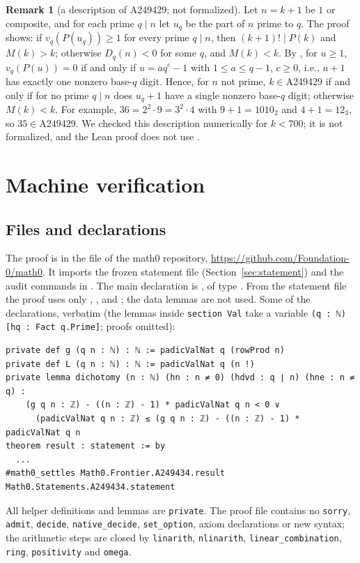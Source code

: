 \documentclass[11pt]{amsart}
\theoremstyle{plain}
\theoremstyle{definition}
\newtheorem{remark}[theorem]{Remark}
\begin{document}
\begin{remark}[a description of A249429; not formalized]\label{rem:A249429}
Let $n=k+1$ be $1$ or composite, and for each prime $q\mid n$ let $u_q$ be the part of $n$ prime to $q$. The proof shows: if $v_q(P(u_q))\ge1$ for every prime $q\mid n$, then $(k+1)!\mid P(k)$ and $M(k)>k$; otherwise $D_q(n)<0$ for some $q$, and $M(k)<k$.
By \cite[Theorem~6.7]{LM}, for $u\ge1$, $v_q(P(u))=0$ if and only if $u=aq^c-1$ with $1\le a\le q-1$, $c\ge0$, i.e., $u+1$ has exactly one nonzero base-$q$ digit. Hence, for $n$ not prime, $k\in{}$A249429 if and only if for no prime $q\mid n$ does $u_q+1$ have a single nonzero base-$q$ digit; otherwise $M(k)<k$.
For example, $36=2^2\cdot9=3^2\cdot4$ with $9+1=1010_2$ and $4+1=12_3$, so $35\in{}$A249429. We checked this description numerically for $k<700$; it is not formalized, and the Lean proof does not use \cite{LM}.
\end{remark}

\section{Machine verification}\label{sec:lean}

\subsection*{Files and declarations}
The proof is in the file  of the math0 repository, \url{https://github.com/Foundation-0/math0}. It imports the frozen statement file  (Section~\ref{sec:statement}) and the audit commands in . The main declaration is , of type . From the statement file the proof uses only , ,  and ; the data lemmas are not used. Some of the declarations, verbatim (the lemmas inside \texttt{section Val} take a variable \texttt{(q : ℕ) [hq : Fact q.Prime]}; proofs omitted):
\begin{lstlisting}
private def g (q n : ℕ) : ℕ := padicValNat q (rowProd n)
private def L (q n : ℕ) : ℕ := padicValNat q (n !)
private lemma dichotomy (n : ℕ) (hn : n ≠ 0) (hdvd : q ∣ n) (hne : n ≠ q) :
    (g q n : ℤ) - ((n : ℤ) - 1) * padicValNat q n < 0 ∨
      (padicValNat q n : ℤ) ≤ (g q n : ℤ) - ((n : ℤ) - 1) * padicValNat q n
theorem result : statement := by
  ...
#math0_settles Math0.Frontier.A249434.result Math0.Statements.A249434.statement
\end{lstlisting}
All helper definitions and lemmas are \texttt{private}. The proof file contains no \texttt{sorry}, \texttt{admit}, \texttt{decide}, \texttt{native\_decide}, \texttt{set\_option}, axiom declarations or new syntax; the arithmetic steps are closed by \texttt{linarith}, \texttt{nlinarith}, \texttt{linear\_combination}, \texttt{ring}, \texttt{positivity} and \texttt{omega}.
\end{document}
